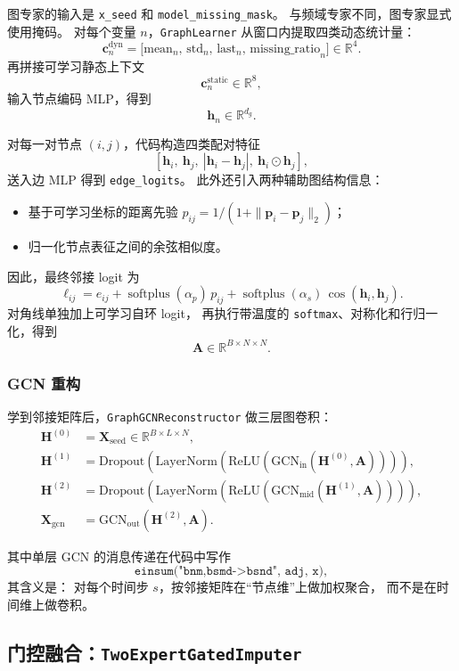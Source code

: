 \documentclass[UTF8,11pt,a4paper]{ctexart}
\DeclareMathOperator{\softplus}{softplus}
\begin{document}
图专家的输入是 \texttt{x\_seed} 和 \texttt{model\_missing\_mask}。
与频域专家不同，图专家显式使用掩码。
对每个变量 $n$，\texttt{GraphLearner} 从窗口内提取四类动态统计量：
\[
\bm{c}^{\mathrm{dyn}}_n=
\big[
\mathrm{mean}_n,\,
\mathrm{std}_n,\,
\mathrm{last}_n,\,
\mathrm{missing\_ratio}_n
\big]\in\mathbb{R}^{4}.
\]
再拼接可学习静态上下文
\[
\bm{c}^{\mathrm{static}}_n\in\mathbb{R}^{8},
\]
输入节点编码 MLP，得到
\[
\bm{h}_n\in\mathbb{R}^{d_g}.
\]

对每一对节点 $(i,j)$，代码构造四类配对特征
\[
[\bm{h}_i,\ \bm{h}_j,\ |\bm{h}_i-\bm{h}_j|,\ \bm{h}_i\odot \bm{h}_j],
\]
送入边 MLP 得到 \texttt{edge\_logits}。
此外还引入两种辅助图结构信息：
\begin{itemize}
  \item 基于可学习坐标的距离先验
  $p_{ij}=1/(1+\|\bm{p}_i-\bm{p}_j\|_2)$；
  \item 归一化节点表征之间的余弦相似度。
\end{itemize}

因此，最终邻接 logit 为
\[
\ell_{ij}
=
e_{ij}
+
\softplus(\alpha_p)\,p_{ij}
+
\softplus(\alpha_s)\,\cos(\bm{h}_i,\bm{h}_j).
\]
对角线单独加上可学习自环 logit，
再执行带温度的 \texttt{softmax}、对称化和行归一化，得到
\[
\bm{A}\in\mathbb{R}^{B\times N\times N}.
\]

\subsubsection{GCN 重构}

学到邻接矩阵后，\texttt{GraphGCNReconstructor} 做三层图卷积：
\begin{align}
\bm{H}^{(0)} &= \bm{X}_{\mathrm{seed}}\in\mathbb{R}^{B\times L\times N},\\
\bm{H}^{(1)} &= \mathrm{Dropout}\!\left(
\mathrm{LayerNorm}\!\left(
\mathrm{ReLU}(\mathrm{GCN}_{\mathrm{in}}(\bm{H}^{(0)},\bm{A}))
\right)\right),\\
\bm{H}^{(2)} &= \mathrm{Dropout}\!\left(
\mathrm{LayerNorm}\!\left(
\mathrm{ReLU}(\mathrm{GCN}_{\mathrm{mid}}(\bm{H}^{(1)},\bm{A}))
\right)\right),\\
\bm{X}_{\mathrm{gcn}} &= \mathrm{GCN}_{\mathrm{out}}(\bm{H}^{(2)},\bm{A}).
\end{align}

其中单层 GCN 的消息传递在代码中写作
\[
\texttt{einsum("bnm,bsmd->bsnd", adj, x)},
\]
其含义是：
对每个时间步 $s$，按邻接矩阵在“节点维”上做加权聚合，
而不是在时间维上做卷积。

\subsection{门控融合：\texttt{TwoExpertGatedImputer}}
\end{document}
